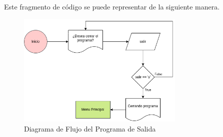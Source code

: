 \documentclass{article}
\begin{document}
Este fragmento de código se puede representar de la siguiente manera.

\begin{figure}[H]
    \centering
    \includegraphics[width=8cm]{programa_salida}
    \caption{Diagrama de Flujo del Programa de Salida}
\end{figure}
\end{document}
